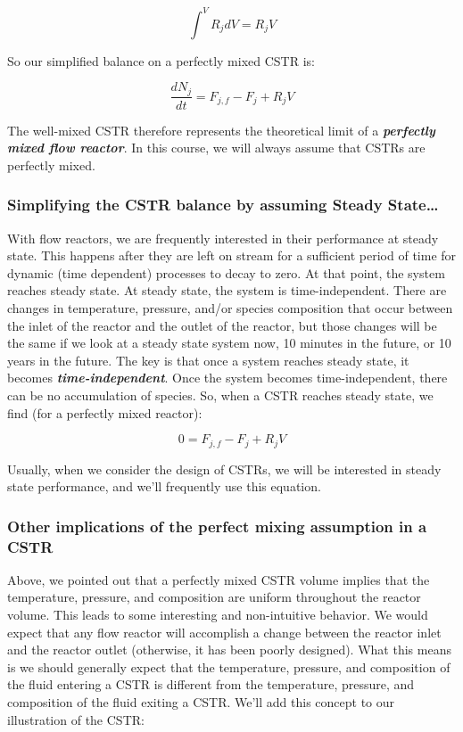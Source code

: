 \documentclass[11pt]{article}
\begin{document}
\[\int^V R_j dV = R_j V\]

So our simplified balance on a perfectly mixed CSTR is:

\[\frac{dN_j}{dt} = F_{j,f} - F_j + R_j V\]

The well-mixed CSTR therefore represents the theoretical limit of a
\textbf{\emph{perfectly mixed flow reactor}}. In this course, we will
always assume that CSTRs are perfectly mixed.

    \hypertarget{simplifying-the-cstr-balance-by-assuming-steady-state}{%
\subsubsection{Simplifying the CSTR balance by assuming Steady
State\ldots{}}\label{simplifying-the-cstr-balance-by-assuming-steady-state}}

With flow reactors, we are frequently interested in their performance at
steady state. This happens after they are left on stream for a
sufficient period of time for dynamic (time dependent) processes to
decay to zero. At that point, the system reaches steady state. At steady
state, the system is time-independent. There are changes in temperature,
pressure, and/or species composition that occur between the inlet of the
reactor and the outlet of the reactor, but those changes will be the
same if we look at a steady state system now, 10 minutes in the future,
or 10 years in the future. The key is that once a system reaches steady
state, it becomes \textbf{\emph{time-independent}}. Once the system
becomes time-independent, there can be no accumulation of species. So,
when a CSTR reaches steady state, we find (for a perfectly mixed
reactor):

\[0 = F_{j,f} - F_j + R_j V\]

Usually, when we consider the design of CSTRs, we will be interested in
steady state performance, and we'll frequently use this equation.

    \hypertarget{other-implications-of-the-perfect-mixing-assumption-in-a-cstr}{%
\subsubsection{Other implications of the perfect mixing assumption in a
CSTR}\label{other-implications-of-the-perfect-mixing-assumption-in-a-cstr}}

Above, we pointed out that a perfectly mixed CSTR volume implies that
the temperature, pressure, and composition are uniform throughout the
reactor volume. This leads to some interesting and non-intuitive
behavior. We would expect that any flow reactor will accomplish a change
between the reactor inlet and the reactor outlet (otherwise, it has been
poorly designed). What this means is we should generally expect that the
temperature, pressure, and composition of the fluid entering a CSTR is
different from the temperature, pressure, and composition of the fluid
exiting a CSTR. We'll add this concept to our illustration of the CSTR:
\end{document}
